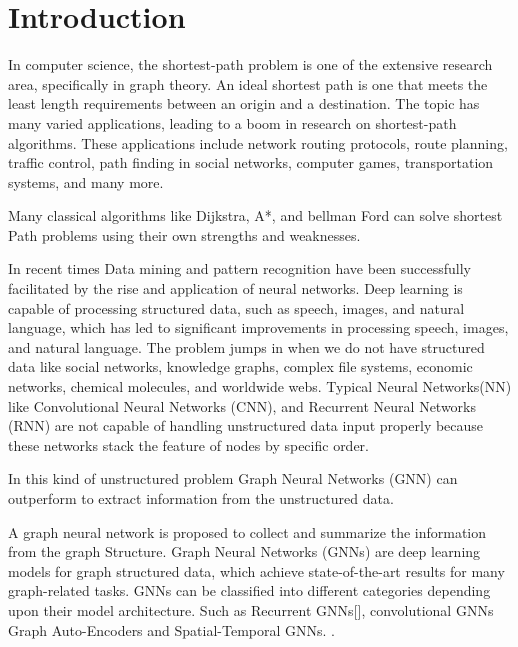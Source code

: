 \documentclass{article}
\begin{document}
\section{Introduction}

In computer science, the shortest-path problem is one of the extensive research area, speciﬁcally in graph theory. An ideal shortest path is one that meets the least length requirements between an origin and a destination. The topic has many varied applications, leading to a boom in research on shortest-path algorithms. These applications include network routing protocols, route planning, traﬃc control, path ﬁnding in social networks, computer games, transportation systems, and many more. \cite{DBLP:journals/corr/MadkourARRB17}

Many classical algorithms like Dijkstra, A*, and bellman Ford can solve shortest Path problems using their own strengths and weaknesses. 

In recent times Data mining and pattern recognition have been successfully facilitated by the rise and application of neural networks. Deep learning is capable of processing structured data, such as speech, images, and natural language, which has led to significant improvements in processing speech, images, and natural language. The problem jumps in when we do not have structured data like social networks, knowledge graphs, complex file systems, economic networks, chemical molecules, and worldwide webs. Typical Neural Networks(NN) like Convolutional Neural Networks (CNN), and Recurrent Neural Networks (RNN) are not capable of handling unstructured data input properly because these networks stack the feature of nodes by specific order. \cite{Mendoza_2019}

In this kind of unstructured problem Graph Neural Networks (GNN) can outperform to extract information from the unstructured data. 

A graph neural network is proposed to collect and summarize the information from the graph Structure. \cite{DBLP:journals/corr/abs-1812-04202}
Graph Neural Networks (GNNs)  are deep learning models for graph structured data, which achieve state-of-the-art results for many graph-related tasks.\cite{data7010010}
GNNs can be classified into different categories depending upon their model architecture. \cite{DBLP:journals/corr/abs-1901-00596}
Such as Recurrent GNNs[], convolutional GNNs \cite{DBLP:journals/corr/HamiltonYL17}
\cite{DBLP:journals/corr/KipfW16}
Graph Auto-Encoders \cite{https://doi.org/10.48550/arxiv.1611.07308}
and Spatial-Temporal GNNs. \cite{Yan_Xiong_Lin_2018}.


\printbibliography
\end{document}
